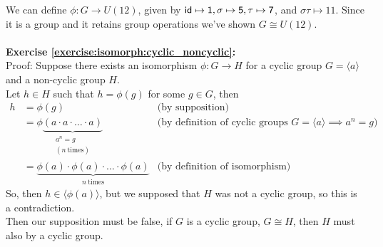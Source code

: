 We can define $\phi:G \rightarrow U(12)$,  given by  $\sf{id} \mapsto 1,  \sigma \mapsto 5, \tau \mapsto 7$, and $\sigma\tau \mapsto 11$. Since it is a group and it retains group operations we've shown $G \cong U(12)$.
\\
\\

\noindent\textbf{Exercise \ref{exercise:isomorph:cyclic_noncyclic}:}
\\
Proof: Suppose there exists an isomorphism $\phi: G \rightarrow H$ for a cyclic group $G = \langle a \rangle$ and a non-cyclic group $H$.
\\
Let $h \in H$ such that $h = \phi(g)$ for some $g \in G$, then
\begin{align*}
h &= \phi(g) &\text{(by supposition)}
\\
&= \phi \underbrace{(a \cdot a \cdot \dotsc \cdot a)}_{\substack{a^n = g \\ (n\  \text{times})}} &\text{(by definition of cyclic groups\ } G = \langle a \rangle \implies a^n = g)
\\
&= \underbrace{\phi(a) \cdot \phi(a) \cdot \dotsc \cdot  \phi(a)}_{n\ \text{times}} &\text{(by definition of isomorphism)}
\end{align*}
So, then $h \in \langle \phi(a) \rangle$, but we supposed that $H$ was not a cyclic group, so this is a contradiction.
\\
Then our supposition must be false, if $G$ is a cyclic group, $G \cong H$, then $H$ must also by a cyclic group.
\\
\\

